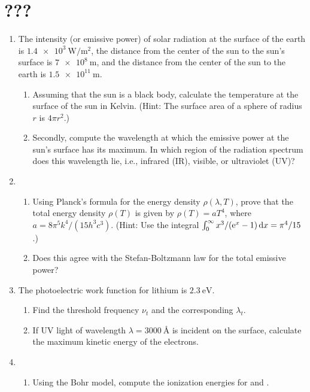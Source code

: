 \documentclass[../psets.tex]{subfiles}
\begin{document}
\section{???}
\begin{enumerate}
    \item {}The intensity (or emissive power) of solar radiation at the surface of the earth is $\SI[per-mode=symbol]{1.4e3}{\watt\per\square\meter}$, the distance from the center of the sun to the sun's surface is $\SI{7e8}{\meter}$, and the distance from the center of the sun to the earth is $\SI{1.5e11}{\meter}$.
    \begin{enumerate}
        \item Assuming that the sun is a black body, calculate the temperature at the surface of the sun in Kelvin. (Hint: The surface area of a sphere of radius $r$ is $4\pi r^2$.)
        \item Secondly, compute the wavelength at which the emissive power at the sun's surface has its maximum. In which region of the radiation spectrum does this wavelength lie, i.e., infrared (IR), visible, or ultraviolet (UV)?
    \end{enumerate}
    \item 
    \begin{enumerate}
        \item Using Planck's formula for the energy density $\rho(\lambda,T)$, prove that the total energy density $\rho(T)$ is given by $\rho(T)=aT^4$, where $a=8\pi^5k^4/(15h^3c^3)$. (Hint: Use the integral $\int_0^\infty x^3/(\e[x]-1)\dd{x}=\pi^4/15$.)
        \item Does this agree with the Stefan-Boltzmann law for the total emissive power?
    \end{enumerate}
    \item The photoelectric work function for lithium is $\SI{2.3}{\electronvolt}$.
    \begin{enumerate}
        \item Find the threshold frequency $\nu_t$ and the corresponding $\lambda_t$.
        \item If UV light of wavelength $\lambda=\SI{3000}{\angstrom}$ is incident on the  surface, calculate the maximum kinetic energy of the electrons.
    \end{enumerate}
    \item 
    \begin{enumerate}
        \item Using the Bohr model, compute the ionization energies for  and .

\end{enumerate}
\end{enumerate}
\end{document}
